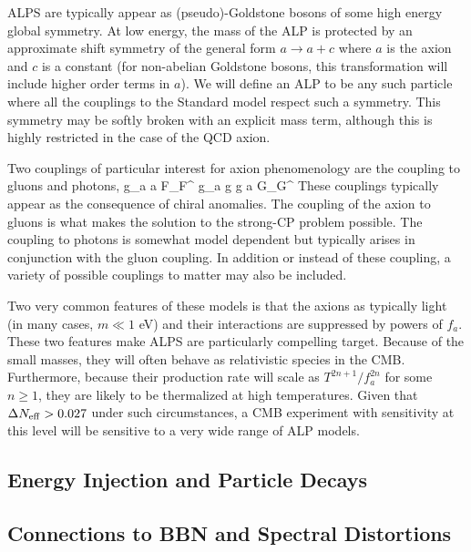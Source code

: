 ALPS are typically appear as (pseudo)-Goldstone bosons of some high energy global symmetry.  At low energy, the mass of the ALP is protected by an approximate shift symmetry of the general form $a \to a + c$ where $a$ is the axion and $c$ is a constant (for non-abelian Goldstone bosons, this transformation will include higher order terms in $a$).  We will define an ALP to be any such particle where all the couplings to the Standard model respect such a symmetry.  This symmetry may be softly broken with an explicit mass term, although this is highly restricted in the case of the QCD axion.

Two couplings of particular interest for axion phenomenology are the coupling to gluons and photons, 
\beq
{} g_{a \gamma \gamma} a \tilde F_{\mu \nu}F^{\mu\nu} \qquad \qquad {} g_{a g g} a \tilde G_{\mu \nu}G^{\mu\nu} 
\eeq
These couplings typically appear as the consequence of chiral anomalies.  The coupling of the axion to gluons is what makes the solution to the strong-CP problem possible.  The coupling to photons is somewhat model dependent but typically arises in conjunction with the gluon coupling.  In addition or instead of these coupling, a variety of possible couplings to matter may also be included.

Two very common features of these models is that the axions as typically light (in many cases, $m \ll 1$ eV) and their interactions are suppressed by powers of $f_a$.  These two features make ALPS are particularly compelling target.  Because of the small masses, they will often behave as relativistic species in the CMB.  Furthermore, because their production rate will scale as $T^{2n +1} / f_a^{2n}$ for some $n \geq 1$, they are likely to be thermalized at high temperatures.  Given that $\Delta N_{\rm eff} > 0.027$ under such circumstances, a CMB experiment with sensitivity at this level will be sensitive to a very wide range of ALP models. 

\subsection{Energy Injection and Particle Decays}

\subsection{Connections to BBN and Spectral Distortions}






